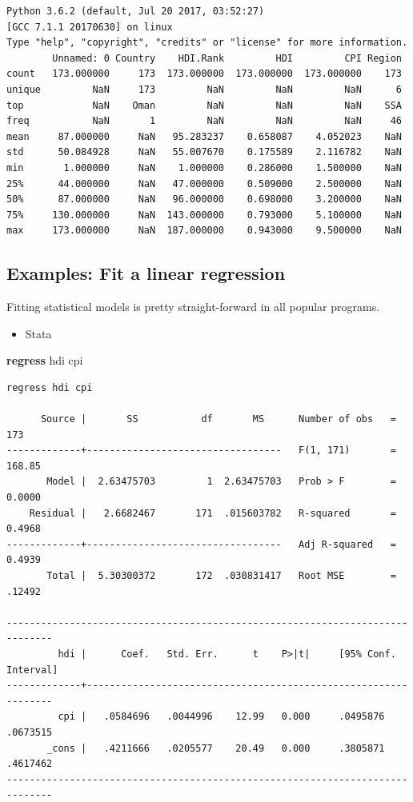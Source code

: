 \documentclass[]{book}
\newenvironment{Shaded}{\begin{snugshade}}{\end{snugshade}}
\newcommand{\KeywordTok}[1]{\textcolor[rgb]{0.13,0.29,0.53}{\textbf{#1}}}
\newcommand{\NormalTok}[1]{#1}
\providecommand{\tightlist}{%
  \setlength{\itemsep}{0pt}\setlength{\parskip}{0pt}}
\begin{document}
\begin{verbatim}
Python 3.6.2 (default, Jul 20 2017, 03:52:27) 
[GCC 7.1.1 20170630] on linux
Type "help", "copyright", "credits" or "license" for more information.
        Unnamed: 0 Country    HDI.Rank         HDI         CPI Region
count   173.000000     173  173.000000  173.000000  173.000000    173
unique         NaN     173         NaN         NaN         NaN      6
top            NaN    Oman         NaN         NaN         NaN    SSA
freq           NaN       1         NaN         NaN         NaN     46
mean     87.000000     NaN   95.283237    0.658087    4.052023    NaN
std      50.084928     NaN   55.007670    0.175589    2.116782    NaN
min       1.000000     NaN    1.000000    0.286000    1.500000    NaN
25%      44.000000     NaN   47.000000    0.509000    2.500000    NaN
50%      87.000000     NaN   96.000000    0.698000    3.200000    NaN
75%     130.000000     NaN  143.000000    0.793000    5.100000    NaN
max     173.000000     NaN  187.000000    0.943000    9.500000    NaN
\end{verbatim}

\hypertarget{examples-fit-a-linear-regression}{%
\subsection{Examples: Fit a linear regression}\label{examples-fit-a-linear-regression}}

Fitting statistical models is pretty straight-forward in all popular programs.

\begin{itemize}
\tightlist
\item
  Stata
\end{itemize}

\begin{Shaded}
\begin{Highlighting}[]
\KeywordTok{regress}\NormalTok{ hdi cpi}
\end{Highlighting}
\end{Shaded}

\begin{verbatim}
regress hdi cpi

      Source |       SS           df       MS      Number of obs   =       173
-------------+----------------------------------   F(1, 171)       =    168.85
       Model |  2.63475703         1  2.63475703   Prob > F        =    0.0000
    Residual |   2.6682467       171  .015603782   R-squared       =    0.4968
-------------+----------------------------------   Adj R-squared   =    0.4939
       Total |  5.30300372       172  .030831417   Root MSE        =    .12492

------------------------------------------------------------------------------
         hdi |      Coef.   Std. Err.      t    P>|t|     [95% Conf. Interval]
-------------+----------------------------------------------------------------
         cpi |   .0584696   .0044996    12.99   0.000     .0495876    .0673515
       _cons |   .4211666   .0205577    20.49   0.000     .3805871    .4617462
------------------------------------------------------------------------------
\end{verbatim}
\end{document}
